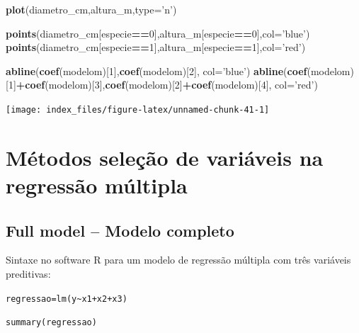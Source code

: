 \documentclass[12pt,brazil,oneside]{book}
\newenvironment{Shaded}{\begin{snugshade}}{\end{snugshade}}
\newcommand{\DataTypeTok}[1]{\textcolor[rgb]{0.13,0.29,0.53}{#1}}
\newcommand{\DecValTok}[1]{\textcolor[rgb]{0.00,0.00,0.81}{#1}}
\newcommand{\KeywordTok}[1]{\textcolor[rgb]{0.13,0.29,0.53}{\textbf{#1}}}
\newcommand{\NormalTok}[1]{#1}
\newcommand{\OperatorTok}[1]{\textcolor[rgb]{0.81,0.36,0.00}{\textbf{#1}}}
\newcommand{\StringTok}[1]{\textcolor[rgb]{0.31,0.60,0.02}{#1}}
\begin{document}
\begin{Shaded}
\begin{Highlighting}[]
\KeywordTok{plot}\NormalTok{(diametro_cm,altura_m,}\DataTypeTok{type=}\StringTok{'n'}\NormalTok{)}

\KeywordTok{points}\NormalTok{(diametro_cm[especie}\OperatorTok{==}\DecValTok{0}\NormalTok{],altura_m[especie}\OperatorTok{==}\DecValTok{0}\NormalTok{],}\DataTypeTok{col=}\StringTok{'blue'}\NormalTok{)}
\KeywordTok{points}\NormalTok{(diametro_cm[especie}\OperatorTok{==}\DecValTok{1}\NormalTok{],altura_m[especie}\OperatorTok{==}\DecValTok{1}\NormalTok{],}\DataTypeTok{col=}\StringTok{'red'}\NormalTok{)}

\KeywordTok{abline}\NormalTok{(}\KeywordTok{coef}\NormalTok{(modelom)[}\DecValTok{1}\NormalTok{],}\KeywordTok{coef}\NormalTok{(modelom)[}\DecValTok{2}\NormalTok{], }\DataTypeTok{col=}\StringTok{'blue'}\NormalTok{)}
\KeywordTok{abline}\NormalTok{(}\KeywordTok{coef}\NormalTok{(modelom)[}\DecValTok{1}\NormalTok{]}\OperatorTok{+}\KeywordTok{coef}\NormalTok{(modelom)[}\DecValTok{3}\NormalTok{],}\KeywordTok{coef}\NormalTok{(modelom)[}\DecValTok{2}\NormalTok{]}\OperatorTok{+}\KeywordTok{coef}\NormalTok{(modelom)[}\DecValTok{4}\NormalTok{], }\DataTypeTok{col=}\StringTok{'red'}\NormalTok{)}
\end{Highlighting}
\end{Shaded}

\begin{center}\texttt{[image: index\_files/figure-latex/unnamed-chunk-41-1]} \end{center}

\hypertarget{metodos-selecao-de-variaveis-na-regressao-multipla}{%
\section{Métodos seleção de variáveis na regressão
múltipla}\label{metodos-selecao-de-variaveis-na-regressao-multipla}}

\hypertarget{full-model-modelo-completo}{%
\subsection{Full model -- Modelo
completo}\label{full-model-modelo-completo}}

Sintaxe no software R para um modelo de regressão múltipla com três
variáveis preditivas:

\texttt{regressao=lm(y\textasciitilde{}x1+x2+x3)}

\texttt{summary(regressao)}
\end{document}
